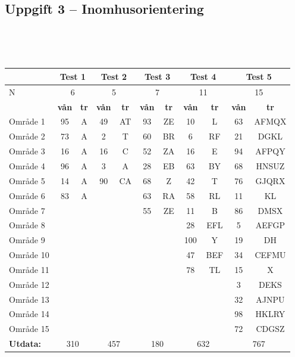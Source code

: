 \documentclass[a4paper,12pt,oneside]{amsbook}
\theoremstyle{test}
\newcommand{\fe}[1]{\textbf{#1}}            %
\begin{document}
\subsection*{Uppgift 3 -- Inomhusorientering}
~\\
{\tt 
\begin{tabular}{||l||c|c||c|c||c|c||c|c||c|c||}\hline\hline
& \multicolumn{2}{c||}{\fe{Test 1}} & \multicolumn{2}{c||}{\fe{Test 2}}& \multicolumn{2}{c||}{\fe{Test 3}} & \multicolumn{2}{c||}{\fe{Test 4}} & \multicolumn{2}{c||}{\fe{Test 5}} \\\hline\hline
N & \multicolumn{2}{c||}{ 6 }& \multicolumn{2}{c||}{ 5} & \multicolumn{2}{c||}{ 7} & \multicolumn{2}{c||}{ 11}& \multicolumn{2}{c||}{ 15}\\ \hline
& \fe{vån} & \fe{tr} & \fe{vån} & \fe{tr}& \fe{vån} & \fe{tr}& \fe{vån} & \fe{tr}& \fe{vån} & \fe{tr} \\ \hline
Område 1	&	95	&	A	&	49	&	AT	&	93	&	ZE	&	10	&	L	&	63	&	AFMQX	\\
Område 2	&	73	&	A	&	2	&	T	&	60	&	BR	&	6	&	RF	&	21	&	DGKL	\\
Område 3	&	16	&	A	&	16	&	C	&	52	&	ZA	&	16	&	E	&	94	&	AFPQY	\\
Område 4	&	96	&	A	&	3	&	A	&	28	&	EB	&	63	&	BY	&	68	&	HNSUZ	\\
Område 5	&	14	&	A	&	90	&	CA	&	68	&	Z	&	42	&	T	&	76	&	GJQRX	\\
Område 6	&	83	&	A	&		&		&	63	&	RA	&	58	&	RL	&	11	&	KL	\\
Område 7	&		&		&		&		&	55	&	ZE	&	11	&	B	&	86	&	DMSX	\\
Område 8	&		&		&		&		&		&		&	28	&	EFL	&	5	&	AEFGP	\\
Område 9	&		&		&		&		&		&		&	100	&	Y	&	19	&	DH	\\
Område 10	&		&		&		&		&		&		&	47	&	BEF	&	34	&	CEFMU	\\
Område 11	&		&		&		&		&		&		&	78	&	TL	&	15	&	X	\\
Område 12	&		&		&		&		&		&		&		&		&	3	&	DEKS	\\
Område 13	&		&		&		&		&		&		&		&		&	32	&	AJNPU	\\
Område 14	&		&		&		&		&		&		&		&		&	98	&	HKLRY	\\
Område 15	&		&		&		&		&		&		&		&		&	72	&	CDGSZ	\\ \hline\hline
\fe{Utdata:} & \multicolumn{2}{c||}{ 310 }& \multicolumn{2}{c||}{ 457} & \multicolumn{2}{c||}{ 180} & \multicolumn{2}{c||}{ 632}& \multicolumn{2}{c||}{ 767} \\ \hline\hline
\end{tabular}
}
\vspace{1cm}
\end{document}
